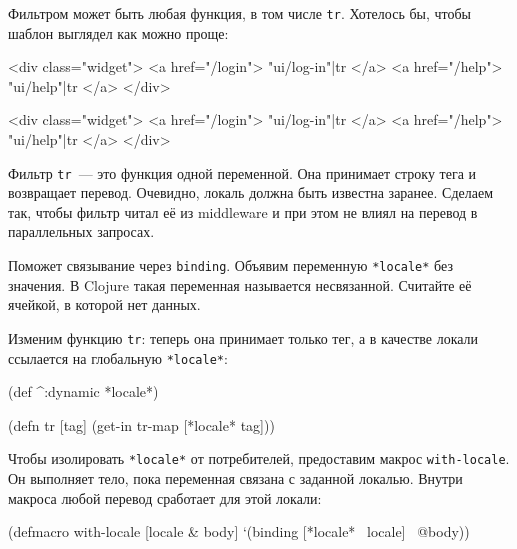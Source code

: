 Фильтром может быть любая функция, в том числе \verb|tr|. Хотелось бы,
чтобы шаблон выглядел как можно проще:

\ifx\DEVICETYPE\MOBILE

\begin{english}
  \begin{htmldjango}
<div class="widget">
  <a href="/login">
    {{ "ui/log-in"|tr }}
  </a>
  <a href="/help">
    {{ "ui/help"|tr }}
  </a>
</div>
  \end{htmldjango}
\end{english}

\else

\begin{english}
  \begin{htmldjango}
<div class="widget">
  <a href="/login">{{ "ui/log-in"|tr }}</a>
  <a href="/help">{{ "ui/help"|tr }}</a>
</div>
  \end{htmldjango}
\end{english}

\fi

Фильтр \verb|tr|~--- это функция одной переменной. Она принимает строку тега и
возвращает перевод. Очевидно, локаль должна быть известна заранее. Сделаем так,
чтобы фильтр читал её из middleware и при этом не влиял на перевод в параллельных
запросах.

Поможет связывание через \verb|binding|. Объявим переменную \verb|*locale*| без
значения. В Clojure такая переменная называется несвязанной. Считайте её
ячейкой, в которой нет данных.

Изменим функцию \verb|tr|: теперь она принимает только тег, а в качестве
локали ссылается на глобальную \verb|*locale*|:

\begin{english}
  \begin{clojure}
(def ^:dynamic *locale*)

(defn tr [tag]
  (get-in tr-map [*locale* tag]))
  \end{clojure}
\end{english}


Чтобы изолировать \verb|*locale*| от потребителей, предоставим макрос
\verb|with-locale|. Он выполняет тело, пока переменная связана с заданной
локалью. Внутри макроса любой перевод сработает для этой локали:

\begin{english}
  \begin{clojure}
(defmacro with-locale
  [locale & body]
  `(binding [*locale* ~locale]
     ~@body))
  \end{clojure}
\end{english}

